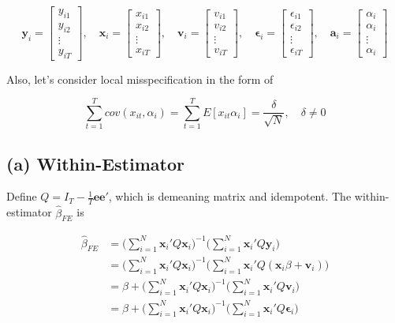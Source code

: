 \documentclass[12pt]{article}
\begin{document}
\[
\mathbf{y}_i =
\begin{bmatrix}
y_{i1}\\ 
y_{i2}\\ 
\vdots\\ 
y_{iT}
\end{bmatrix}, \quad 
\mathbf{x}_i =
\begin{bmatrix}
x_{i1}\\ 
x_{i2}\\ 
\vdots\\ 
x_{iT}
\end{bmatrix}, \quad 
\mathbf{v}_i=
\begin{bmatrix}
v_{i1}\\ 
v_{i2}\\ 
\vdots\\ 
v_{iT}
\end{bmatrix}, \quad 
\mathbf{\epsilon}_i=
\begin{bmatrix}
\epsilon_{i1}\\ 
\epsilon_{i2}\\ 
\vdots\\ 
\epsilon_{iT}
\end{bmatrix}, \quad
\mathbf{a}_i=
\begin{bmatrix}
\alpha_i\\ 
\alpha_i\\ 
\vdots\\ 
\alpha_i
\end{bmatrix}
\]
 
\vspace{0.2in}

Also, let's consider local misspecification in the form of

\[
\sum_{t=1}^{T} cov(x_{it}, \alpha_i) = \sum_{t=1}^T E[x_{it}\alpha_i] = \frac{\delta}{\sqrt{N}}, \quad \delta \neq 0
\]

\vspace{0.2in}

\subsection*{(a) Within-Estimator}

Define $Q=I_T - \frac{1}{T} \mathbf{ee'}$, which is demeaning matrix and idempotent. The within-estimator $\widehat{\beta}_{FE}$ is 

\begin{align*}
\widehat{\beta}_{FE} &= \bigg(\sum_{i=1}^{N} \mathbf{x}_i' Q \mathbf{x}_i\bigg)^{-1}\bigg(\sum_{i=1}^{N} \mathbf{x}_i' Q\mathbf{y}_i   \bigg)\\
&= \bigg(\sum_{i=1}^{N} \mathbf{x}_i' Q \mathbf{x}_i\bigg)^{-1}\bigg(\sum_{i=1}^{N} \mathbf{x}_i' Q( \mathbf{x}_i \beta + \mathbf{v}_i) \bigg)\\
&= \beta + \bigg(\sum_{i=1}^{N} \mathbf{x}_i' Q \mathbf{x}_i\bigg)^{-1}\bigg(\sum_{i=1}^{N} \mathbf{x}_i'Q\mathbf{v}_i   \bigg)\\
&=\beta + \bigg(\sum_{i=1}^{N} \mathbf{x}_i' Q \mathbf{x}_i\bigg)^{-1}\bigg(\sum_{i=1}^{N} \mathbf{x}_i' Q\mathbf{\epsilon}_i   \bigg)\\
\end{align*}
\end{document}
